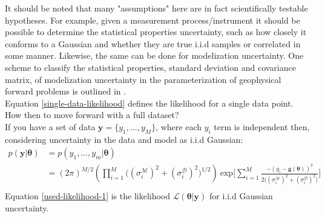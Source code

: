 It should be noted that many "assumptions" here are in fact scientifically testable hypotheses. For example, given a measurement process/instrument it should be possible to determine the statistical properties uncertainty, such as how closely it conforms to a Gaussian and whether they are true i.i.d samples or correlated in some manner. Likewise, the same can be done for modelization uncertainty. One scheme to classify the statistical properties, standard deviation and covariance matrix, of modelization uncertainty in the parameterization of geophysical forward problems is outlined in \citet{afonso2013b}.\\

Equation \ref{single-data-likelihood} defines the likelihood for a single data point. How then to move forward with a full dataset?\\

If you have a set of data $\bm{y} = \{y_1,...,y_M\}$, where each $y_i$ term is independent then, considering uncertainty in the data and model as i.i.d Gaussian:
\begin{equation}
\begin{split}
p(\bm{y}|\bm{\theta}) &= p(y_1,...,y_m|\bm{\theta})\\
&= (2\pi)^{M/2}(\prod_{i = 1}^{M}\big((\sigma^{\mathcal{M}}_i)^2+(\sigma^{\mathcal{D}}_i)^2\big)^{1/2})\ \text{exp}\bigg[\sum_{i = 1}^{M}\frac{-(y_i-\bm{g}({\bm{\theta}}))^2}{2\big((\sigma^{\mathcal{M}}_i)^2+(\sigma^{\mathcal{D}}_i)^2\big)}\bigg]\\
\label{used-likelihood-1}
\end{split}
\end{equation}
Equation \ref{used-likelihood-1} is the likelihood $\mathcal{L}(\bm{\theta}|\bm{y})$ for i.i.d Gaussian uncertainty.\\ 

